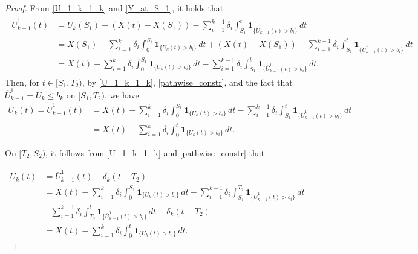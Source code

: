 \documentclass[12pt,reqno]{amsart}
\theoremstyle{definition}
\theoremstyle{remark}
\newcommand{\ind}{\mathbf{1}}
\begin{document}
\begin{proof}
		From \eqref{U_1_k_1_k} and \eqref{Y_at_S_1}, it holds that
		\begin{align}
		\begin{split}
\overline{U}_{k-1}^1(t)  &= U_k(S_1) + (X(t) - X(S_1))-\sum_{i=1}^{k-1}\delta_i \int_{S_1}^t \ind_{\{\overline{U}_{k-1}^1(t)> b_i\}}\,dt \\
		&=  X(S_1)-\sum_{i=1}^{k}\delta_i \int_0^{S_1} \ind_{\{U_k(t)>b_i\}}\,dt + (X(t) - X(S_1))-\sum_{i=1}^{k-1}\delta_i \int_{S_1}^t 
		\ind_{\{\overline{U}_{k-1}^1(t)> b_i\}}\,dt \\
		&=  X(t)-\sum_{i=1}^{k}\delta_i \int_0^{S_1} \ind_{\{U_k(t)>b_i\}}\,dt -\sum_{i=1}^{k-1}\delta_i \int_{S_1}^t \ind_{\{\overline{U}_{k-1}^1(t)> b_i\}}
		\,dt.
		\end{split}	\end{align}
		Then, for  $t \in [S_1, T_2)$, by \eqref{U_1_k_1_k}, \eqref{pathwise_constr}, and the fact that $\overline{U}^1_{k-1} = U_k \leq b_k$ on $[S_1,T_2)$, 
		we have
		\begin{align*}
U_k(t)=\overline{U}_{k-1}^1(t) 
		&=  X(t)-\sum_{i=1}^{k}\delta_i \int_0^{S_1} \ind_{\{U_k(t)>b_i\}}\,dt -\sum_{i=1}^{k-1}\delta_i \int_{S_1}^t \ind_{\{\overline{U}_{k-1}^1(t)> b_i\}}\,dt \\
		&=  X(t)-\sum_{i=1}^{k}\delta_i \int_0^{t} \ind_{\{U_k(t)>b_i\}}\,dt.
			\end{align*}
%
				
				On $[T_2,S_2)$, it follows from \eqref{U_1_k_1_k} and \eqref{pathwise_constr} that
				
						\begin{align*}
						U_k(t) &= \overline{U}_{k-1}^1(t) -\delta_k(t-T_2)\\
		&=  X(t)-\sum_{i=1}^{k}\delta_i \int_0^{S_1} \ind_{\{U_k(t)>b_i\}}\,dt -\sum_{i=1}^{k-1}\delta_i \int_{S_1}^{T_2} 
		\ind_{\{\overline{U}_{k-1}^1(t)> b_i\}}\,dt \\&-\sum_{i=1}^{k-1}\delta_i \int_{T_2}^t \ind_{\{\overline{U}_{k-1}^1(t)> b_i\}}\,dt  -\delta_k(t-T_2)\\
		&=X(t)-\sum_{i=1}^{k}\delta_i \int_0^{t} \ind_{\{U_k(t)>b_i\}}\,dt.
			\end{align*}
		

\end{proof}
\end{document}
